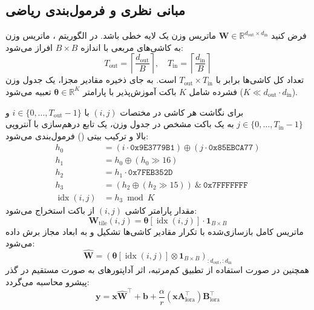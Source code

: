 \subsection{مبانی نظری و فرمول‌بندی ریاضی}
فرض کنید $\mathbf{W} \in \mathbb{R}^{d_{\text{out}} \times d_{\text{in}}}$ ماتریس وزن یک لایه خطی باشد. در الگوریتم ، ماتریس وزن به کاشی‌های مربعی با اندازه $B \times B$ افراز می‌شود:
\begin{equation}
T_{\text{out}} = \left\lceil \frac{d_{\text{out}}}{B} \right\rceil, \quad T_{\text{in}} = \left\lceil \frac{d_{\text{in}}}{B} \right\rceil
\end{equation}
تعداد کل کاشی‌ها برابر با $T_{\text{out}} \times T_{\text{in}}$ است. به جای ذخیره مقادیر مجزا، یک جدول وزن فشرده شامل $K$ باکت آموزش‌پذیر با پارامتر $\boldsymbol{\theta} \in \mathbb{R}^K$ تعبیه می‌شود ($K \ll d_{\text{out}} \cdot d_{\text{in}}$).

برای نگاشت هر کاشی در مختصات $(i, j)$ با $i \in \{0, \dots, T_{\text{out}}-1\}$ و $j \in \{0, \dots, T_{\text{in}}-1\}$ به یک باکت مشخص در جدول وزن، یک تابع درهم‌سازی با آنتروپی بالا و ترکیب بیتی () فرمول‌بندی می‌شود:
\begin{align}
h_0 &= (i \cdot \mathtt{0x9E3779B1}) \oplus (j \cdot \mathtt{0x85EBCA77}) \\
h_1 &= h_0 \oplus (h_0 \gg 16) \\
h_2 &= h_1 \cdot \mathtt{0x7FEB352D} \\
h_3 &= (h_2 \oplus (h_2 \gg 15)) \ \& \ \mathtt{0x7FFFFFFF} \\
\operatorname{idx}(i, j) &= h_3 \bmod K
\end{align}
مقدار پارامتر کاشی $(i, j)$ از باکت استخراج می‌شود:
\begin{equation}
\mathbf{W}_{\text{tile}}(i, j) = \boldsymbol{\theta}[\operatorname{idx}(i, j)] \cdot \mathbf{1}_{B \times B}
\end{equation}
ماتریس کامل بازسازی‌شده با تکرار مقادیر کاشی‌ها تشکیل و به ابعاد مجاز برش داده می‌شود:
\begin{equation}
\hat{\mathbf{W}} = \left( \boldsymbol{\theta}[\operatorname{idx}(i, j)] \otimes \mathbf{1}_{B \times B} \right)_{:d_{\text{out}}, :d_{\text{in}}}
\end{equation}
همچنین در صورت استفاده از تطبیق کم‌مرتبه، اثر آداپتورهای  به صورت مستقیم در گذر پیشرو محاسبه می‌گردد:
\begin{equation}
\mathbf{y} = \mathbf{x} \hat{\mathbf{W}}^\top + \mathbf{b} + \frac{\alpha}{r} (\mathbf{x} \mathbf{A}_{\text{lora}}^\top) \mathbf{B}_{\text{lora}}^\top
\end{equation}


